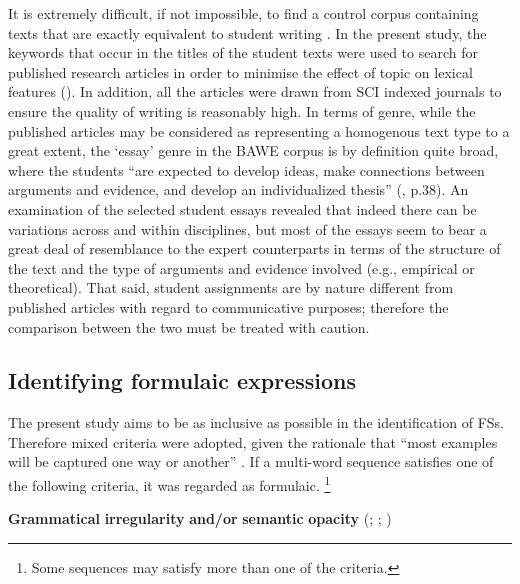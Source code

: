 It is extremely difficult, if not impossible, to find a control corpus containing texts that are exactly equivalent to student writing \citep{Callies2015}. In the present study, the keywords that occur in the titles of the student texts were used to search for published research articles in order to minimise the effect of topic on lexical features (\citealt{CainesButtery2017}). In addition, all the articles were drawn from SCI indexed journals to ensure the quality of writing is reasonably high. In terms of genre, while the published articles may be considered as representing a homogenous text type to a great extent, the ‘essay’ genre in the BAWE corpus is by definition quite broad, where the students “are expected to develop ideas, make connections between arguments and evidence, and develop an individualized thesis” (\citealt{NesiGardner2012}, p.38). An examination of the selected student essays revealed that indeed there can be variations across and within disciplines, but most of the essays seem to bear a great deal of resemblance to the expert counterparts in terms of the structure of the text and the type of arguments and evidence involved (e.g., empirical or theoretical). That said, student assignments are by nature different from published articles with regard to communicative purposes; therefore the comparison between the two must be treated with caution. 

\subsection{Identifying formulaic expressions}

The present study aims to be as inclusive as possible in the identification of FSs. Therefore mixed criteria were adopted, given the rationale that “most examples will be captured one way or another” \citep[110]{Wray2008}. If a multi-word sequence satisfies one of the following criteria, it was regarded as formulaic. \footnote{ \textrm{Some sequences may satisfy more than one of the criteria.}}

\textbf{Grammatical} \textbf{irregularity} \textbf{and/or} \textbf{semantic} \textbf{opacity} (\citealt{Wray2008}; \citealt{SchneiderEtAl2014}; \citealt{Herbst2015})

